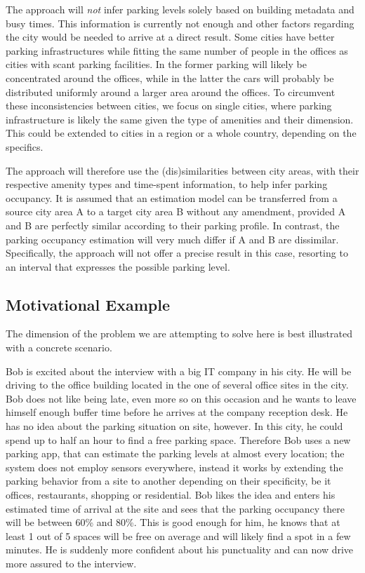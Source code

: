 	The approach will \textit{not} infer parking levels solely based on building metadata and busy times. This information is currently not enough and other factors regarding the city would be needed to arrive at a direct result. Some cities have better parking infrastructures while fitting the same number of people in the offices as cities with scant parking facilities. In the former parking will likely be concentrated around the offices, while in the latter the cars will probably be distributed uniformly around a larger area around the offices. To circumvent these inconsistencies between cities, we focus on single cities, where parking infrastructure is likely the same given the type of amenities and their dimension. This could be extended to cities in a region or a whole country, depending on the specifics.
	
	The approach will therefore use the (dis)similarities between city areas, with their respective amenity types and time-spent information, to help infer parking occupancy. It is assumed that an estimation model can be transferred from a source city area A to a target city area B without any amendment, provided A and B are perfectly similar according to their parking profile. In contrast, the parking occupancy estimation will very much differ if A and B are dissimilar. Specifically, the approach will not offer a precise result in this case, resorting to an interval that expresses the possible parking level.
	
	\subsection{Motivational Example}
	The dimension of the problem we are attempting to solve here is best illustrated with a concrete scenario.
	
	Bob is excited about the interview with a big IT company in his city. He will be driving to the office building located in the one of several office sites in the city. Bob does not like being late, even more so on this occasion and he wants to leave himself enough buffer time before he arrives at the company reception desk. He has no idea about the parking situation on site, however. In this city, he could spend up to half an hour to find a free parking space. Therefore Bob uses a new parking app, that can estimate the parking levels at almost every location; the system does not employ sensors everywhere, instead it works by extending the parking behavior from a site to another depending on their specificity, be it offices, restaurants, shopping or residential. Bob likes the idea and enters his estimated time of arrival at the site and sees that the parking occupancy there will be between 60\% and 80\%. This is good enough for him, he knows that at least 1 out of 5 spaces will be free on average and will likely find a spot in a few minutes. He is suddenly more confident about his punctuality and can now drive more assured to the interview.
	
